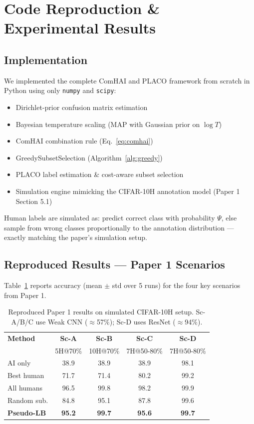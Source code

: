 \documentclass[10pt,twocolumn]{article}
\begin{document}
\section{Code Reproduction \& Experimental Results}

\subsection{Implementation}

We implemented the complete ComHAI and PLACO framework from scratch in
Python using only \texttt{numpy} and \texttt{scipy}:
\begin{itemize}[leftmargin=*,nosep,itemsep=2pt]
  \item Dirichlet-prior confusion matrix estimation
  \item Bayesian temperature scaling (MAP with Gaussian prior on $\log T$)
  \item ComHAI combination rule (Eq.~\ref{eq:comhai})
  \item GreedySubsetSelection (Algorithm~\ref{alg:greedy})
  \item PLACO label estimation \& cost-aware subset selection
  \item Simulation engine mimicking the CIFAR-10H annotation model
    (Paper 1 Section 5.1)
\end{itemize}

Human labels are simulated as: predict correct class with probability
$\Psi$, else sample from wrong classes proportionally to the annotation
distribution --- exactly matching the paper's simulation setup.

\subsection{Reproduced Results --- Paper 1 Scenarios}

Table~\ref{tab:scenarios} reports accuracy (mean $\pm$ std over 5 runs)
for the four key scenarios from Paper 1.

\begin{table}[!ht]
\centering
\caption{Reproduced Paper 1 results on simulated CIFAR-10H setup.
  Sc-A/B/C use Weak CNN ($\approx$57\%); Sc-D uses ResNet ($\approx$94\%).}
\label{tab:scenarios}
\small
\setlength{\tabcolsep}{4pt}
\begin{tabular}{lcccc}
\toprule
\textbf{Method} & \textbf{Sc-A} & \textbf{Sc-B} & \textbf{Sc-C} & \textbf{Sc-D}\\
 & 5H@70\% & 10H@70\% & 7H@50-80\% & 7H@50-80\%\\
\midrule
AI only     & 38.9 & 38.9 & 38.9 & 98.1\\
Best human  & 71.7 & 71.4 & 80.2 & 99.2\\
All humans  & 96.5 & 99.8 & 98.2 & 99.9\\
Random sub. & 84.8 & 95.1 & 87.8 & 99.6\\
\textbf{Pseudo-LB} & \textbf{95.2} & \textbf{99.7} & \textbf{95.6} & \textbf{99.7}\\
\bottomrule
\end{tabular}
\end{table}
\end{document}
